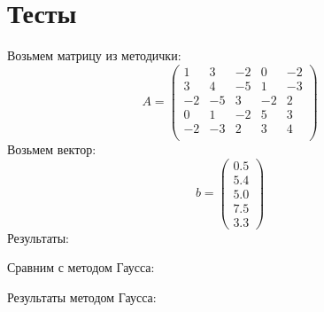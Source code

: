 \documentclass[14pt, titlepage,fleqn]{extarticle}
\begin{document}
	\section*{Тесты}
	Возьмем матрицу из методички:
	\[A = \begin{pmatrix}
		1 & 3 & -2 & 0 & -2\\
        3 & 4 & -5 & 1 & -3\\
        -2 & -5 & 3 & -2 & 2\\
        0 & 1 & -2 & 5 & 3\\
        -2 & -3 & 2 & 3 & 4\\
	\end{pmatrix}\]
	Возьмем вектор:
	\[b =\begin{pmatrix}
		0.5\\
        5.4\\
        5.0\\
        7.5\\
    	3.3
	\end{pmatrix} \]
	Результаты:
	\begin{figure}[H]
	\end{figure}

	\newpage
	Сравним с методом Гаусса:

	
	Результаты методом Гаусса:
	\begin{figure}[H]
	\end{figure}
\end{document}
